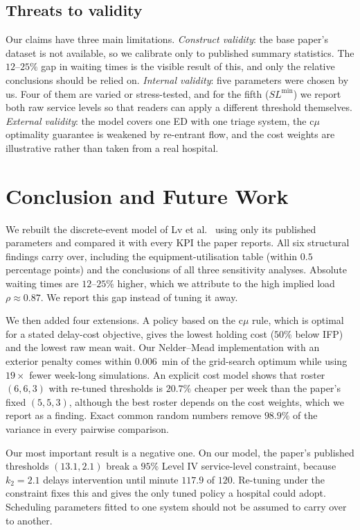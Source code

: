 \documentclass[sigconf,nonacm]{acmart}
\begin{document}
\subsection{Threats to validity}
Our claims have three main limitations. \emph{Construct validity}: the base
paper's dataset is not available, so we calibrate only to published summary
statistics. The $12$--$25\%$ gap in waiting times is the visible result of
this, and only the relative conclusions should be relied on. \emph{Internal
validity}: five parameters were chosen by us. Four of them are varied or
stress-tested, and for the fifth ($SL^{\min}$) we report both raw service
levels so that readers can apply a different threshold themselves.
\emph{External validity}: the model covers one ED with one triage system, the
c$\mu$ optimality guarantee is weakened by re-entrant flow, and the cost
weights are illustrative rather than taken from a real hospital.

\section{Conclusion and Future Work}

We rebuilt the discrete-event model of Lv et al.~\cite{lv2026des} using only
its published parameters and compared it with every KPI the paper reports. All
six structural findings carry over, including the equipment-utilisation table
(within $0.5$ percentage points) and the conclusions of all three sensitivity
analyses. Absolute waiting times are $12$--$25\%$ higher, which we attribute to
the high implied load $\rho\approx0.87$. We report this gap instead of tuning
it away.

We then added four extensions. A policy based on the c$\mu$ rule, which is
optimal for a stated delay-cost objective, gives the lowest holding cost
($50\%$ below IFP) and the lowest raw mean wait. Our Nelder--Mead
implementation with an exterior penalty comes within $0.006$~min of the
grid-search optimum while using $19\times$ fewer week-long simulations. An
explicit cost model shows that roster $(6,6,3)$ with re-tuned thresholds is
$20.7\%$ cheaper per week than the paper's fixed $(5,5,3)$, although the best
roster depends on the cost weights, which we report as a finding. Exact common
random numbers remove $98.9\%$ of the variance in every pairwise comparison.

Our most important result is a negative one. On our model, the paper's
published thresholds $(13.1, 2.1)$ break a $95\%$ Level IV service-level
constraint, because $k_2 = 2.1$ delays intervention until minute $117.9$ of
$120$. Re-tuning under the constraint fixes this and gives the only tuned
policy a hospital could adopt. Scheduling parameters fitted to one system
should not be assumed to carry over to another.
\end{document}
